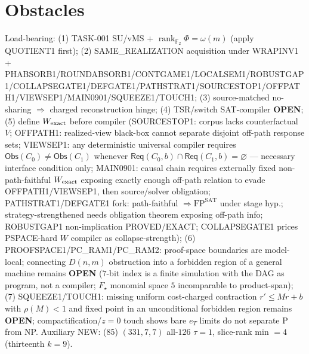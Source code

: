 \documentclass[11pt]{article}
\begin{document}
\section*{Obstacles}
Load-bearing: (1) TASK-001 SU/vMS + $\operatorname{rank}_{\mathbb F_2}\Phi=\omega(m)$ (apply QUOTIENT1 first);
(2) SAME\_REALIZATION acquisition under WRAPINV1 + PHABSORB1/ROUNDABSORB1/CONTGAME1/LOCALSEM1/ROBUSTGAP1/COLLAPSEGATE1/DEFGATE1/PATHSTRAT1/SOURCESTOP1/OFFPATH1/VIEWSEP1/MAIN0901/SQUEEZE1/TOUCH1;
(3) source-matched no-sharing $\Rightarrow$ charged reconstruction hinge;
(4) TSR/switch SAT-compiler \textbf{OPEN};
(5) define $W_{\rm exact}$ before compiler (SOURCESTOP1: corpus lacks counterfactual $V$;
OFFPATH1: realized-view black-box cannot separate disjoint off-path response sets;
VIEWSEP1: any deterministic universal compiler requires $\mathsf{Obs}(C_0)\ne\mathsf{Obs}(C_1)$
whenever $\mathsf{Req}(C_0,b)\cap\mathsf{Req}(C_1,b)=\varnothing$ --- necessary interface condition only;
MAIN0901: causal chain requires externally fixed non-path-faithful $W_{\rm exact}$ exposing
exactly enough off-path relation to evade OFFPATH1/VIEWSEP1, then source/solver obligation;
PATHSTRAT1/DEFGATE1 fork: path-faithful $\Rightarrow\mathrm{FP}^{\mathrm{SAT}}$ under stage hyp.;
strategy-strengthened needs obligation theorem exposing off-path info;
ROBUSTGAP1 non-implication PROVED/EXACT; COLLAPSEGATE1 prices PSPACE-hard $W$ compiler as collapse-strength);
(6) PROOFSPACE1/PC\_RAM1/PC\_RAM2: proof-space boundaries are model-local; connecting $D(n,m)$ obstruction into a
forbidden region of a general machine remains \textbf{OPEN} ($7$-bit index is a finite simulation with the DAG as program, not a compiler; $F_\star$ monomial space $5$ incomparable to product-span);
(7) SQUEEZE1/TOUCH1: missing uniform cost-charged contraction $r'\le Mr+b$ with $\rho(M)<1$ and fixed point in an unconditional forbidden region remains \textbf{OPEN}; compactification/$z{=}0$ touch shows bare $e_T$ limits do not separate P from NP.
Auxiliary NEW: (85) $(331,7,7)$ all-$126$ $\tau{=}1$, slice-rank min $=4$ (thirteenth $k{=}9$).
\end{document}
